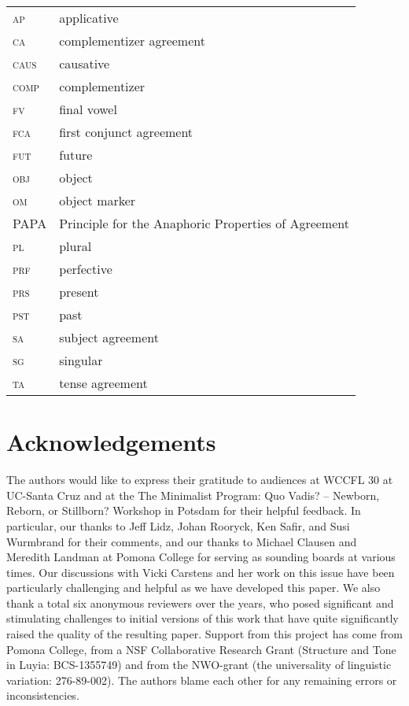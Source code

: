 \documentclass[output=paper
,modfonts
,nonflat
]{langsci/langscibook}
\begin{document}
\begin{tabular}{ll}
\textsc{ap} & applicative \\ 
\textsc{ca} & complementizer agreement \\ 
\textsc{caus} & causative \\ 
\textsc{comp} & complementizer \\
\textsc{fv} & final vowel \\ 
\textsc{fca} & first conjunct agreement \\
\textsc{fut} & future \\
\textsc{obj} & object \\
\textsc{om} & object marker \\ 
PAPA & Principle for the Anaphoric Properties of Agreement \\
\textsc{pl} & plural \\
\textsc{prf} & perfective \\ 
\textsc{prs} & present \\ 
\textsc{pst} & past \\ 
\textsc{sa} & subject agreement \\ 
\textsc{sg} & singular \\
\textsc{ta} & tense agreement \\
\end{tabular}

\section*{Acknowledgements}
The authors would like to express their gratitude to audiences at WCCFL 30 at UC-Santa Cruz and at the The Minimalist Program: Quo Vadis? – Newborn, Reborn, or Stillborn? Workshop in Potsdam for their helpful feedback. In particular, our thanks to Jeff Lidz, Johan Rooryck, Ken Safir, and Susi Wurmbrand for their comments, and our thanks to Michael Clausen and Meredith Landman at Pomona College for serving as sounding boards at various times. Our discussions with Vicki Carstens and her work on this issue have been particularly challenging and helpful as we have developed this paper. We also thank a total six anonymous reviewers over the years, who posed significant and stimulating challenges to initial versions of this work that have quite significantly raised the quality of the resulting paper. Support from this project has come from Pomona College, from a NSF Collaborative Research Grant (Structure and Tone in Luyia: BCS-1355749) and from the NWO-grant (the universality of linguistic variation: 276-89-002). The authors blame each other for any remaining errors or inconsistencies.

\printbibliography[heading=subbibliography,notkeyword=this]
\end{document}
